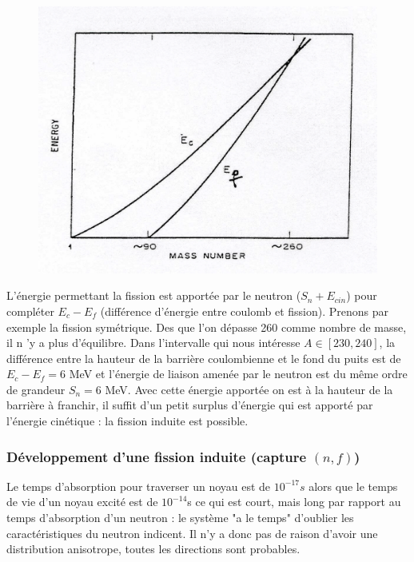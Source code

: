 	\begin{figure}
	\vspace{-5mm}
	\includegraphics[scale=0.2]{ch1/image11.png}
	\end{figure}
L'énergie permettant la fission est apportée par le neutron ($S_n+E_{cin}$) pour compléter 
$E_c-E_f$ (différence d'énergie entre coulomb et fission). Prenons par exemple la fission 
symétrique. Des que l'on dépasse 260 comme nombre de masse, il n 'y a plus d'équilibre. Dans 
l'intervalle qui nous intéresse $A\in[230,240]$, la différence entre la hauteur de la barrière 
coulombienne et le fond du puits est de $E_c-E_f=6$ MeV et l'énergie de liaison amenée par 
le neutron est du même ordre de grandeur $S_n = 6$ MeV. Avec cette énergie apportée on est à 
la hauteur de la barrière à franchir, il suffit d'un petit surplus d'énergie qui est apporté 
par l'énergie cinétique : la fission induite est possible.\\


\subsubsection{Développement d'une fission induite (capture $(n,f)$)}
Le temps d'absorption pour traverser un noyau est de $10^{-17}s$ alors que le temps de vie d'un 
noyau excité est de $10^{-14}$s ce qui est court, mais long par rapport au temps 
d'absorption d'un neutron : le système "a le temps" d'oublier les caractéristiques du neutron 
indicent. Il n'y a donc pas de raison d'avoir une distribution anisotrope, toutes les directions 
sont probables.\\

